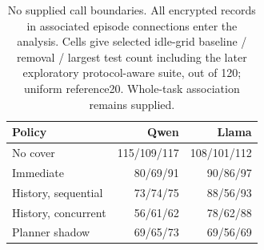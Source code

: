 \begin{table}[t]\centering\small
\caption{No supplied call boundaries. All encrypted records in associated episode connections enter the analysis. Cells give selected idle-grid baseline / removal / largest test count including the later exploratory protocol-aware suite, out of 120; uniform reference20. Whole-task association remains supplied.}\label{tab:no-call-main}
\begin{tabularx}{\columnwidth}{@{}Yrr@{}}\toprule
Policy & Qwen & Llama \\\midrule
No cover & 115/109/117 & 108/101/112 \\
Immediate & 80/69/91 & 90/86/97 \\
History, sequential & 73/74/75 & 88/56/93 \\
History, concurrent & 56/61/62 & 78/62/88 \\
Planner shadow & 69/65/73 & 69/56/69 \\
\bottomrule\end{tabularx}\end{table}
